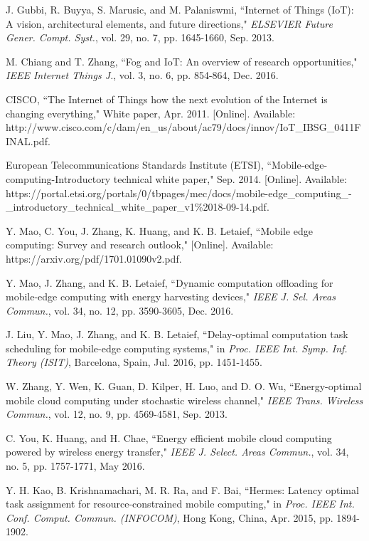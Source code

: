 \documentclass[journal,draftcls,onecolumn,12pt,twoside]{IEEEtran}
\begin{document}
\begin{thebibliography}{1}

J. Gubbi, R. Buyya, S. Marusic, and M. Palaniswmi, ``Internet of Things (IoT): A vision, architectural elements, and future directions," \emph{ELSEVIER Future Gener. Compt. Syst.}, vol. 29, no. 7, pp. 1645-1660, Sep. 2013.

M. Chiang and T. Zhang, ``Fog and IoT: An overview of research opportunities," \emph{IEEE Internet Things J.}, vol. 3, no. 6, pp. 854-864, Dec. 2016.

CISCO, ``The Internet of Things how the next evolution of the Internet is changing everything," White paper, Apr. 2011. [Online]. Available: http://www.cisco.com/c/dam/en\_us/about/ac79/docs/innov/IoT\_IBSG\_0411FINAL.pdf.

European Telecommunications Standards Institute (ETSI), ``Mobile-edge-computing-Introductory technical white paper," Sep. 2014. [Online]. Available: https://portal.etsi.org/portals/0/tbpages/mec/docs/mobile-edge\_computing\_-\_introductory\_technical\_white\_paper\_v1\%2018-09-14.pdf.

Y. Mao, C. You, J. Zhang, K. Huang, and K. B. Letaief, ``Mobile edge computing: Survey and research outlook," [Online]. Available: https://arxiv.org/pdf/1701.01090v2.pdf.

Y. Mao, J. Zhang, and K. B. Letaief, ``Dynamic computation offloading for mobile-edge computing with energy harvesting devices," \emph{IEEE J. Sel. Areas Commun.}, vol. 34, no. 12, pp. 3590-3605, Dec. 2016.

J. Liu, Y. Mao, J. Zhang, and K. B. Letaief, ``Delay-optimal computation task scheduling for mobile-edge computing systems," in \emph{Proc. IEEE Int. Symp. Inf. Theory (ISIT)}, Barcelona, Spain, Jul. 2016, pp. 1451-1455.

W. Zhang, Y. Wen, K. Guan, D. Kilper, H. Luo, and D. O. Wu, ``Energy-optimal mobile cloud computing under stochastic wireless channel," \emph{IEEE Trans. Wireless Commun.}, vol. 12, no. 9, pp. 4569-4581, Sep. 2013.

C. You, K. Huang, and H. Chae, ``Energy efficient mobile cloud computing powered by wireless energy transfer," \emph{IEEE J. Select. Areas Commun.}, vol. 34, no. 5, pp. 1757-1771, May 2016.

Y. H. Kao, B. Krishnamachari, M. R. Ra, and F. Bai, ``Hermes: Latency optimal task assignment for resource-constrained mobile computing," in \emph{Proc. IEEE Int. Conf. Comput. Commun. (INFOCOM)}, Hong Kong, China, Apr. 2015, pp. 1894-1902.


\end{thebibliography}
\end{document}

